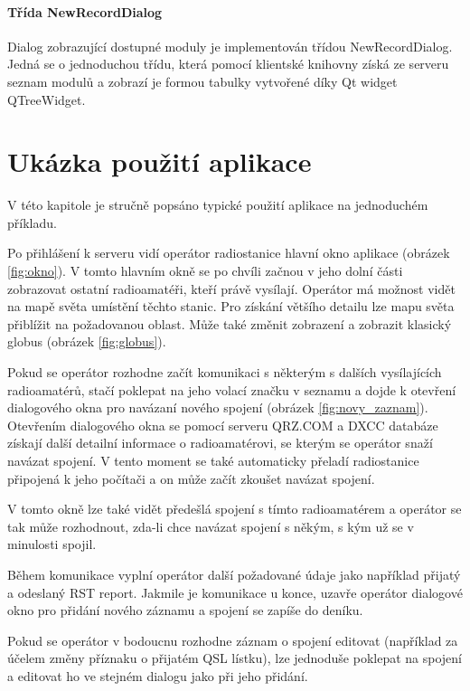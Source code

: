 \subsubsection{Třída NewRecordDialog}

Dialog zobrazující dostupné moduly je implementován třídou NewRecordDialog. Jedná se o jednoduchou třídu, která pomocí
klientské knihovny získá ze serveru seznam modulů a zobrazí je formou tabulky vytvořené díky Qt widget QTreeWidget.

\chapter{Ukázka použití aplikace}

V této kapitole je stručně popsáno typické použití aplikace na jednoduchém příkladu.

Po přihlášení k serveru vidí operátor radiostanice hlavní okno aplikace (obrázek \ref{fig:okno}).
V tomto hlavním okně se po chvíli začnou v jeho dolní části zobrazovat ostatní radioamatéři, kteří
právě vysílají. Operátor má možnost vidět na mapě světa umístění těchto stanic. Pro získání většího 
detailu lze mapu světa přiblížit na požadovanou oblast. Může také změnit zobrazení a zobrazit klasický
globus (obrázek \ref{fig:globus}).

Pokud se operátor rozhodne začít komunikaci s některým s dalších vysílajících radioamatérů, stačí
poklepat na jeho volací značku v seznamu a dojde k otevření dialogového okna pro navázaní nového spojení (obrázek \ref{fig:novy_zaznam}).
Otevřením dialogového okna se pomocí serveru QRZ.COM a DXCC databáze získají další detailní informace o radioamatérovi, se kterým 
se operátor snaží navázat spojení. V tento moment se také automaticky přeladí radiostanice připojená
k jeho počítači a on může začít zkoušet navázat spojení.

V tomto okně lze také vidět předešlá spojení s tímto radioamatérem a operátor se tak může rozhodnout, zda-li chce
navázat spojení s někým, s kým už se v minulosti spojil.

Během komunikace vyplní operátor další požadované údaje jako například přijatý a odeslaný RST report. Jakmile je komunikace
u konce, uzavře operátor dialogové okno pro přidání nového záznamu a spojení se zapíše do deníku.

Pokud se operátor v bodoucnu rozhodne záznam o spojení editovat (například za účelem změny příznaku o 
přijatém QSL lístku), lze jednoduše poklepat na spojení a editovat ho ve stejném dialogu jako při jeho
přidání.

